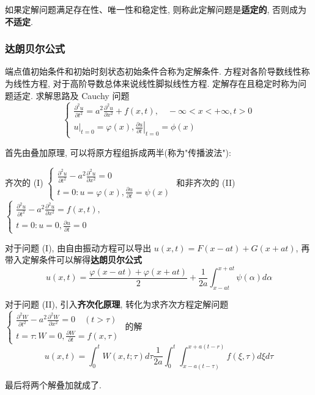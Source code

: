 \documentclass[10pt]{yerbaformat}
\begin{document}
\par 如果定解问题满足存在性、唯一性和稳定性, 则称此定解问题是\textbf{适定的}, 否则成为\textbf{不适定}.

\subsubsection{达朗贝尔公式}

\par 端点值初始条件和初始时刻状态初始条件合称为定解条件. 方程对各阶导数线性称为线性方程, 对于高阶导数总体来说线性脚拟线性方程. 定解存在且稳定时称为问题适定. 求解思路及 Cauchy 问题
$$
    \left\{\begin{array}{l}
        \frac{\partial^{2} u}{\partial t^{2}}=a^{2} \frac{\partial^{2} u}{\partial x^{2}} + f(x, t), \quad-\infty<x<+\infty, t>0 \\
        \left.u\right|_{t=0}=\varphi(x),\left.\frac{\partial u}{\partial t}\right|_{t=0}=\phi(x)
    \end{array}\right.
$$
\par 首先由叠加原理, 可以将原方程组拆成两半(称为"传播波法"):

齐次的 (I) $\left\{\begin{array}{l}\frac{\partial^{2} u}{\partial t^{2}}-a^{2} \frac{\partial^{2} u}{\partial x^{2}}=0 \\ t=0: u=\varphi(x), \frac{\partial u}{\partial t}=\psi(x)\end{array}\right.$
和非齐次的 (II) $\left\{\begin{array}{l}\frac{\partial^{2} u}{\partial t^{2}}-a^{2} \frac{\partial^{2} u}{\partial x^{2}}=f(x, t), \\ t=0: u=0, \frac{\partial u}{\partial t}=0\end{array}\right.$

\par 对于问题 (I), 由自由振动方程可以导出 $u(x, t)=F(x-a t)+G(x+a t)$, 再带入定解条件可以解得\textbf{达朗贝尔公式}
$$
    u(x, t)=\frac{\varphi(x-a t)+\varphi(x+a t)}{2}+\frac{1}{2 a} \int_{x-a t}^{x+a t} \psi(\alpha) d \alpha
$$

\par 对于问题 (II), 引入\textbf{齐次化原理}, 转化为求齐次方程定解问题 $\left\{\begin{array}{l}\frac{\partial^{2} W}{\partial t^{2}}-a^{2} \frac{\partial^{2} W}{\partial x^{2}}=0 \quad(t>\tau) \\ t=\tau: W=0, \frac{\partial W}{\partial t}=f(x, \tau)\end{array}\right.$ 的解 $$u(x, t)=\int_{0}^{t} W(x, t ; \tau) d \tau \frac{1}{2 a} \int_{0}^{t} \int_{x-a(t-\tau)}^{x+a(t-r)} f(\xi, \tau) d \xi d \tau $$
\par 最后将两个解叠加就成了.
\end{document}
